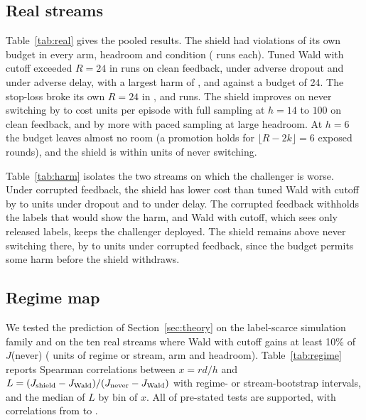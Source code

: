 \documentclass[10pt]{article}
\theoremstyle{plain}
\theoremstyle{definition}
\begin{document}
\subsection{Real streams}
Table~\ref{tab:real} gives the pooled results. The shield had \RealShieldViolClean{} violations of its own budget in every arm, headroom and condition (\RealRunsPerArm{} runs each).
Tuned Wald with cutoff exceeded $R=24$ in \RealWaldExceedClean{} runs on clean feedback, \RealWaldExceedDropout{} under adverse dropout and \RealWaldExceedDelay{} under adverse delay, with a largest harm of \RealWaldMaxClean, \RealWaldMaxDropout{} and \RealWaldMaxDelay{} against a budget of 24. The stop-loss broke its own $R=24$ in \RealStopExceedClean, \RealStopExceedDropout{} and \RealStopExceedDelay{} runs.
The shield improves on never switching by \RealPiVsNeverCleanHfourteen{} to \RealPiVsNeverCleanHhundred{} cost units per episode with full sampling at $h=14$ to $100$ on clean feedback, and by more with paced sampling at large headroom. At $h=6$ the budget leaves almost no room (a promotion holds for $\lfloor R-2k\rfloor=6$ exposed rounds), and the shield is within \RealSixVsNever{} units of never switching.

Table~\ref{tab:harm} isolates the two streams on which the challenger is worse. Under corrupted feedback, the shield has lower cost than tuned Wald with cutoff by \HarmDropMin{} to \HarmDropMax{} units under dropout and \HarmDelayMin{} to \HarmDelayMax{} under delay. The corrupted feedback withholds the labels that would show the harm, and Wald with cutoff, which sees only released labels, keeps the challenger deployed. The shield remains above never switching there, by \HarmNeverMin{} to \HarmNeverMax{} units under corrupted feedback, since the budget permits some harm before the shield withdraws.

\begin{table}[t]
\caption{Two harmful streams (airlines, bank): $\Delta J$ of the full-sampling shield against Wald with cutoff and against never switching, by headroom $h$.}\label{tab:harm}
\centering\scriptsize
\resizebox{\linewidth}{!}{}
\end{table}

\subsection{Regime map}\label{sec:regimemap}
We tested the prediction of Section~\ref{sec:theory} on the label-scarce simulation family and on the ten real streams where Wald with cutoff gains at least 10\% of $J$(never) (\NUnits{} units of regime or stream, arm and headroom). Table~\ref{tab:regime} reports Spearman correlations between $x=rd/h$ and $L=(J_{\rm shield}-J_{\rm Wald})/(J_{\rm never}-J_{\rm Wald})$ with regime- or stream-bootstrap intervals, and the median of $L$ by bin of $x$.
All \RegimeTestsSupported{} of \RegimeTestsTotal{} pre-stated tests are supported, with correlations from \SpearLo{} to \SpearHi.
\end{document}
